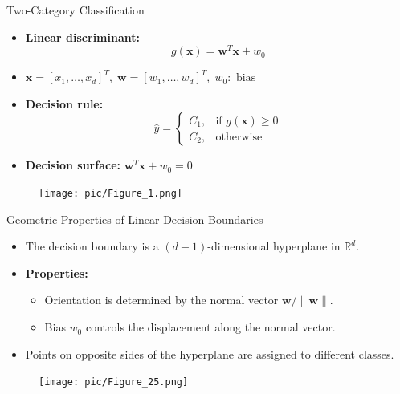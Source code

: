 \documentclass[serif, aspectratio=169]{beamer}
\begin{document}
    \begin{frame}{Two-Category Classification}
        \begin{itemize}\itemsep1.2em
        \item \textbf{Linear discriminant:}
        \[
            g(\mathbf{x}) = \mathbf{w}^T\mathbf{x} + w_0
        \]
        \item \(\mathbf{x} = [x_1, \dots, x_d]^T,\; \mathbf{w} = [w_1, \dots, w_d]^T,\; w_0:\text{ bias}\)
        \item \textbf{Decision rule:}
        \[
            \hat{y} =
            \begin{cases}
                C_1, & \text{if } g(\mathbf{x}) \ge 0 \\
                C_2, & \text{otherwise}
            \end{cases}
        \]
        \item \textbf{Decision surface:} $\mathbf{w}^T\mathbf{x} + w_0 = 0$
        \end{itemize}
        \endminipage
        \hfill
        \begin{figure}[bh]
            \texttt{[image: pic/Figure\_1.png]}
        \end{figure}
        \endminipage
    \end{frame}


    \begin{frame}{Geometric Properties of Linear Decision Boundaries}
        \begin{itemize}\itemsep1.2em
        \item The decision boundary is a $(d-1)$-dimensional hyperplane in $\mathbb{R}^d$.
        \item \textbf{Properties:}
        \begin{itemize}
            \item Orientation is determined by the normal vector $\mathbf{w}/\|\mathbf{w}\|$.
            \item Bias $w_0$ controls the displacement along the normal vector.
        \end{itemize}
        \item Points on opposite sides of the hyperplane are assigned to different classes.
        \end{itemize}
        \begin{figure}
            \texttt{[image: pic/Figure\_25.png]}
        \end{figure}
    \end{frame}
\end{document}
